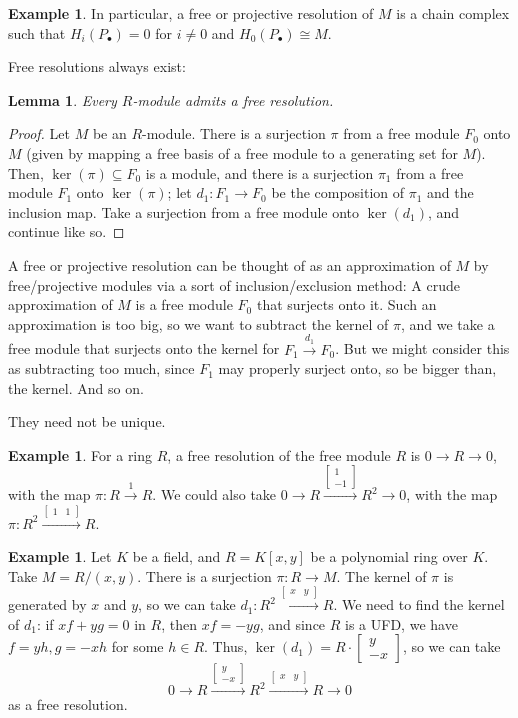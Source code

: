 \documentclass{amsart}[12pt]
\def\ker{\operatorname{ker}}
\numberwithin{equation}{section}
\theoremstyle{plain} %
\newtheorem{lem}[equation]{Lemma}
\theoremstyle{definition}
\newtheorem{ex}[equation]{Example}
\theoremstyle{remark}
\newcommand{\xra}[1]{\xrightarrow{#1}}
\begin{document}
\begin{ex}
In particular, a free or projective resolution of $M$ is a chain complex such that $H_i(P_\bullet) = 0$ for $i\neq 0$ and $H_0(P_\bullet) \cong M$.


Free resolutions always exist:

\begin{lem} Every $R$-module admits a free resolution.
\end{lem}
\begin{proof}
Let $M$ be an $R$-module. There is a surjection $\pi$ from a free module $F_0$ onto $M$ (given by mapping a free basis of a free module to a generating set for $M$). Then, $\ker(\pi)\subseteq F_0$ is a module, and there is a surjection $\pi_1$ from a free module $F_1$ onto $\ker(\pi)$; let $d_1:F_1 \to F_0$ be the composition of $\pi_1$ and the inclusion map. Take a surjection from a free module onto $\ker(d_1)$, and continue like so.
\end{proof}

A free or projective resolution can be thought of as an approximation of $M$ by free/projective modules via a sort of inclusion/exclusion method: A crude approximation of $M$ is a free module $F_0$ that surjects onto it. Such an approximation is too big, so we want to subtract the kernel of $\pi$, and we take a free module that surjects onto the kernel for $F_1 \xra{d_1} F_0$. But we might consider this as subtracting too much, since $F_1$ may properly surject onto, so be bigger than, the kernel. And so on.


They need not be unique.

\begin{ex} For a ring $R$, a free resolution of the free module $R$ is $0 \to R \to 0$, with the map $\pi:R\xra{1} R$. We could also take $0 \to R \xra{\begin{bmatrix} 1 \\ -1\end{bmatrix}} R^2 \to 0$, with the map $\pi: R^2 \xra{ \begin{bmatrix} 1 & 1\end{bmatrix} } R$.
\end{ex}


\begin{ex} Let $K$ be a field, and $R=K[x,y]$ be a polynomial ring over $K$. Take $M=R/(x,y)$. There is a surjection $\pi:R\to M$. The kernel of $\pi$ is generated by $x$ and $y$, so we can take $d_1:R^2 \xra{\begin{bmatrix} x & y\end{bmatrix}} R$. We need to find the kernel of $d_1$: if $xf+yg=0$ in $R$, then $xf=-yg$, and since $R$ is a UFD, we have $f=yh, g=-xh$ for some $h\in R$. Thus, $\ker(d_1) = R\cdot \begin{bmatrix} y \\ -x\end{bmatrix}$, so we can take
\[ 0 \to R \xra{\begin{bmatrix} y \\ -x\end{bmatrix}} R^2 \xra{\begin{bmatrix} x & y\end{bmatrix}} R \to 0\]
as a free resolution.
\end{ex}


\end{ex}
\end{document}
